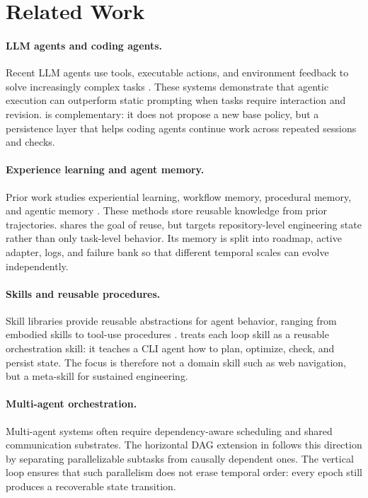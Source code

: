 \section{Related Work}

\paragraph{LLM agents and coding agents.}
Recent LLM agents use tools, executable actions, and environment feedback to solve increasingly complex tasks \citep{codeact,alphaevolve,automind}. These systems demonstrate that agentic execution can outperform static prompting when tasks require interaction and revision. \ours{} is complementary: it does not propose a new base policy, but a persistence layer that helps coding agents continue work across repeated sessions and checks.

\paragraph{Experience learning and agent memory.}
Prior work studies experiential learning, workflow memory, procedural memory, and agentic memory \citep{expel,awm,memp,legomem,xu2025amemagenticmemoryllm,reme}. These methods store reusable knowledge from prior trajectories. \ours{} shares the goal of reuse, but targets repository-level engineering state rather than only task-level behavior. Its memory is split into roadmap, active adapter, logs, and failure bank so that different temporal scales can evolve independently.

\paragraph{Skills and reusable procedures.}
Skill libraries provide reusable abstractions for agent behavior, ranging from embodied skills to tool-use procedures \citep{voyager,anthropic_skills}. \ours{} treats each loop skill as a reusable orchestration skill: it teaches a CLI agent how to plan, optimize, check, and persist state. The focus is therefore not a domain skill such as web navigation, but a meta-skill for sustained engineering.

\paragraph{Multi-agent orchestration.}
Multi-agent systems often require dependency-aware scheduling and shared communication substrates. The horizontal DAG extension in \ours{} follows this direction by separating parallelizable subtasks from causally dependent ones. The vertical loop ensures that such parallelism does not erase temporal order: every epoch still produces a recoverable state transition.

